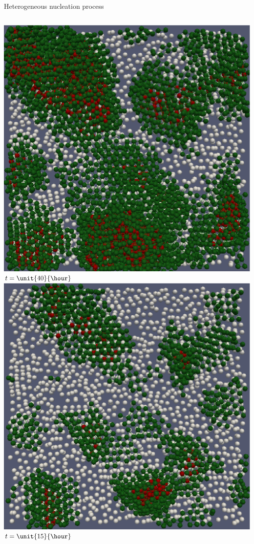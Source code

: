 \begin{frame}{Heterogeneous nucleation process}
\begin{columns}
	\bigskip\includegraphics[width=\columnwidth]{X_t200}\\
	$t=\unit{40}{\hour}$
	\includegraphics[width=\columnwidth]{X_t075}\\
	$t=\unit{15}{\hour}$
	

\end{columns}
\end{frame}
